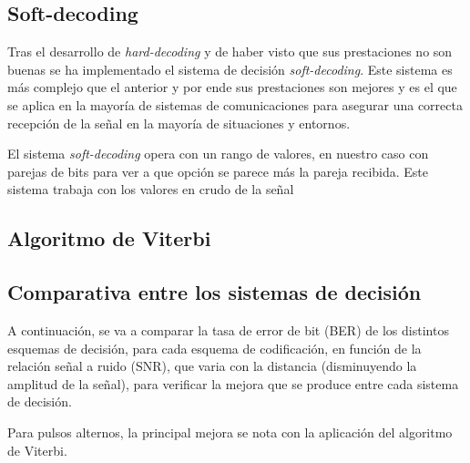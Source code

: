 \subsection{Soft-decoding}
Tras el desarrollo de \textit{hard-decoding} y de haber visto que sus prestaciones no son 
buenas se ha implementado el sistema de decisión \textit{soft-decoding}. 
Este sistema es más complejo que el anterior y por ende sus prestaciones son mejores y 
es el que se aplica en la mayoría de sistemas de comunicaciones para asegurar una 
correcta recepción de la señal en la mayoría de situaciones y entornos.

El sistema \textit{soft-decoding} opera con un rango de valores, en nuestro caso con 
parejas de bits para ver a que opción se parece más la pareja recibida. Este sistema 
trabaja con los valores en crudo de la señal 






\subsection{Algoritmo de Viterbi}


\subsection{Comparativa entre los sistemas de decisión}
A continuación, se va a comparar la tasa de error de bit (BER) de los distintos esquemas de decisión, para cada esquema 
de codificación, en función de la relación señal a ruido (SNR), que varia con la distancia (disminuyendo la 
amplitud de la señal), para verificar la mejora que se produce entre cada sistema de decisión.

Para pulsos alternos, la principal mejora se nota con la aplicación del algoritmo de Viterbi.

